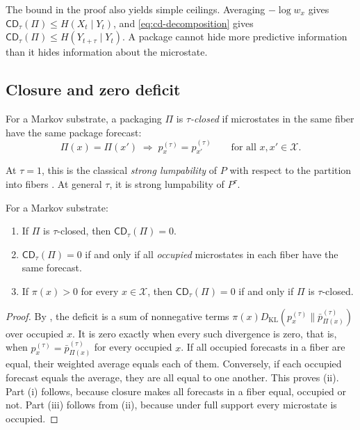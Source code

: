 The bound in the proof also yields simple ceilings. Averaging $-\log w_x$ gives $\mathsf{CD}_\tau(\Pi)\le H(X_t\mid Y_t)$, and \eqref{eq:cd-decomposition} gives $\mathsf{CD}_\tau(\Pi)\le H(Y_{t+\tau}\mid Y_t)$. A package cannot hide more predictive information than it hides information about the microstate.

\subsection{Closure and zero deficit}

\begin{definition}\label{def:tau-closed}
For a Markov substrate, a packaging $\Pi$ is \emph{$\tau$-closed} if microstates in the same fiber have the same package forecast:
\begin{equation}
\Pi(x)=\Pi(x')
\;\Longrightarrow\;
p_x^{(\tau)} = p_{x'}^{(\tau)}
\qquad\text{for all } x,x'\in\mathcal{X}.
\label{eq:tau-closed}
\end{equation}
\end{definition}

At $\tau=1$, this is the classical \emph{strong lumpability} of $P$ with respect to the partition into fibers \citep{kemeny1976finitemarkovchains,buchholz1994exactordinarylumpability}. At general $\tau$, it is strong lumpability of $P^\tau$.

\begin{proposition}\label{prop:cd-zero}
For a Markov substrate:
\begin{enumerate}
\item[(i)] If $\Pi$ is $\tau$-closed, then $\mathsf{CD}_\tau(\Pi)=0$.
\item[(ii)] $\mathsf{CD}_\tau(\Pi)=0$ if and only if all \emph{occupied} microstates in each fiber have the same forecast.
\item[(iii)] If $\pi(x)>0$ for every $x\in\mathcal{X}$, then $\mathsf{CD}_\tau(\Pi)=0$ if and only if $\Pi$ is $\tau$-closed.
\end{enumerate}
\end{proposition}

\begin{proof}
By , the deficit is a sum of nonnegative terms $\pi(x)D_{\mathrm{KL}}(p_x^{(\tau)}\|\bar p_{\Pi(x)}^{(\tau)})$ over occupied $x$. It is zero exactly when every such divergence is zero, that is, when $p_x^{(\tau)}=\bar p_{\Pi(x)}^{(\tau)}$ for every occupied $x$. If all occupied forecasts in a fiber are equal, their weighted average equals each of them. Conversely, if each occupied forecast equals the average, they are all equal to one another. This proves (ii). Part (i) follows, because closure makes all forecasts in a fiber equal, occupied or not. Part (iii) follows from (ii), because under full support every microstate is occupied.
\end{proof}

